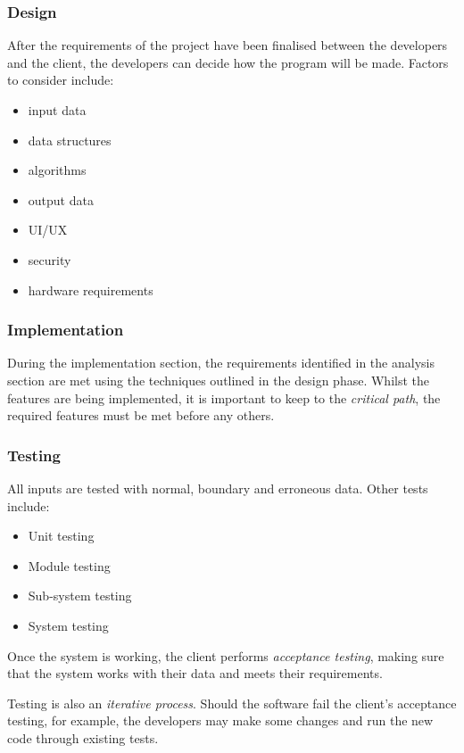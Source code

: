 \documentclass[10pt]{article}
\begin{document}
\subsubsection{Design}
\label{sec:orgd1b5f2d}

After the requirements of the project have been finalised between the developers and the client, the developers can decide how the program will be made. Factors to consider include:

\begin{itemize}
\item input data
\item data structures
\item algorithms
\item output data
\item UI/UX
\item security
\item hardware requirements
\end{itemize}

\subsubsection{Implementation}
\label{sec:org32db975}

During the implementation section, the requirements identified in the analysis section are met using the techniques outlined in the design phase. Whilst the features are being implemented, it is important to keep to the \emph{critical path}, the required features must be met before any others.

\subsubsection{Testing}
\label{sec:org72d0986}

All inputs are tested with normal, boundary and erroneous data. Other tests include:

\begin{itemize}
\item Unit testing
\item Module testing
\item Sub-system testing
\item System testing
\end{itemize}

Once the system is working, the client performs \emph{acceptance testing}, making sure that the system works with their data and meets their requirements.

Testing is also an \emph{iterative process}. Should the software fail the client's acceptance testing, for example, the developers may make some changes and run the new code through existing tests.
\end{document}
